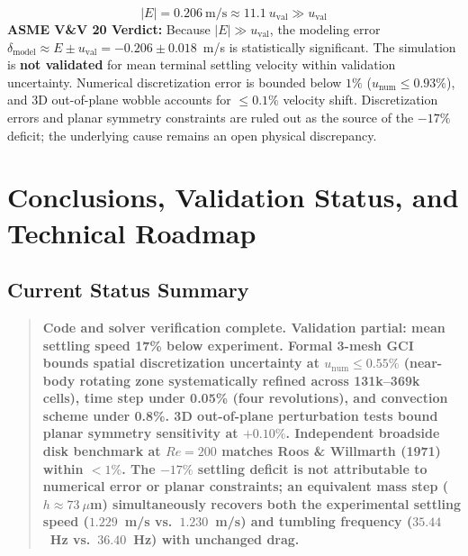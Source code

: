 \documentclass[11pt,a4paper]{article}
\begin{document}
\begin{equation}
|E| = 0.206\ \mathrm{m/s} \approx 11.1\ u_{\mathrm{val}} \gg u_{\mathrm{val}}
\end{equation}
\textbf{ASME V\&V 20 Verdict:} Because $|E| \gg u_{\mathrm{val}}$, the modeling error $\delta_{\mathrm{model}} \approx E \pm u_{\mathrm{val}} = -0.206 \pm 0.018$~m/s is statistically significant. The simulation is \textbf{not validated} for mean terminal settling velocity within validation uncertainty. Numerical discretization error is bounded below $1\%$ ($u_{\mathrm{num}} \le 0.93\%$), and 3D out-of-plane wobble accounts for $\le 0.1\%$ velocity shift. Discretization errors and planar symmetry constraints are ruled out as the source of the $-17\%$ deficit; the underlying cause remains an open physical discrepancy.

\section{Conclusions, Validation Status, and Technical Roadmap}

\subsection{Current Status Summary}
\begin{quote}
\textbf{Code and solver verification complete. Validation partial: mean settling speed 17\% below experiment. Formal 3-mesh GCI bounds spatial discretization uncertainty at $u_{\mathrm{num}} \le 0.55\%$ (near-body rotating zone systematically refined across 131k--369k cells), time step under 0.05\% (four revolutions), and convection scheme under 0.8\%. 3D out-of-plane perturbation tests bound planar symmetry sensitivity at $+0.10\%$. Independent broadside disk benchmark at $Re = 200$ matches Roos \& Willmarth (1971) within $< 1\%$. The $-17\%$ settling deficit is not attributable to numerical error or planar constraints; an equivalent mass step ($h \approx 73\ \mu$m) simultaneously recovers both the experimental settling speed ($1.229$~m/s vs.\ $1.230$~m/s) and tumbling frequency ($35.44$~Hz vs.\ $36.40$~Hz) with unchanged drag.}
\end{quote}
\end{document}
